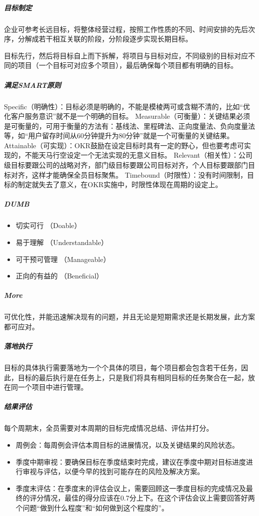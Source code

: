 \documentclass[letterpaper,11pt,english]{sphinxmanual}
\begin{document}
\subparagraph{目标制定}
\label{\detokenize{chapter_idea/goal:id1}}
企业可参考长远目标，将整体经营过程，按照工作性质的不同、时间安排的先后次序，分解成若干相互关联的阶段，分阶段逐步实现长期目标。

目标先行，然后将目标自上而下拆解，将项目与目标对应，不同级别的目标对应不同的项目（一个目标可对应多个项目），最后确保每个项目都有明确的目标。


\subparagraph{满足SMART原则}
\label{\detokenize{chapter_idea/goal:smart}}
Specific（明确性）：目标必须是明确的，不能是模棱两可或含糊不清的，比如“优化客户服务意识”就不是一个明确的目标。
Measurable（可衡量）：关键结果必须是可衡量的，可用于衡量的方法有：基线法、里程碑法、正向度量法、负向度量法等，如“用户留存时间从60分钟提升为80分钟”就是一个可衡量的关键结果。
Attainable（可实现）：OKR鼓励在设定目标时具有一定的野心，但也要考虑可实现的，不能天马行空设定一个无法实现的无意义目标。
Relevant（相关性）：公司级目标要跟公司的战略对齐，部门级目标要跟公司目标对齐，个人目标要跟部门目标对齐，这样才能确保全员目标聚焦。
Time\sphinxhyphen{}bound（时限性）：没有时间限制，目标的制定就失去了意义，在OKR实施中，时限性体现在周期的设定上。


\subparagraph{DUMB}
\label{\detokenize{chapter_idea/goal:dumb}}\begin{itemize}
\item {} 
切实可行 （Doable）

\item {} 
易于理解 （Understandable）

\item {} 
可干预可管理 （Manageable）

\item {} 
正向的有益的 （Beneficial）

\end{itemize}


\subparagraph{More}
\label{\detokenize{chapter_idea/goal:more}}
可优化性，并能迅速解决现有的问题，并且无论是短期需求还是长期发展，此方案都可应对。


\subparagraph{落地执行}
\label{\detokenize{chapter_idea/goal:id2}}
目标的具体执行需要落地为一个个具体的项目，每个项目都会包含若干任务，因此，目标的最后执行是在任务上，只是我们将具有相同目标的任务聚合在一起，放在同一个项目中进行管理。


\subparagraph{结果评估}
\label{\detokenize{chapter_idea/goal:id3}}
每个周期末，全员需要对本周期的目标完成情况总结、评估并打分。
\begin{itemize}
\item {} 
周例会：每周例会评估本周目标的进展情况，以及关键结果的风险状态。

\item {} 
季度中期审视：要确保目标在季度结束时完成，建议在季度中期对目标进度进行审视与评估，以便今早的找到可能存在的风险及解决方案。

\item {} 
季度末评估：在季度末的评估会议上，需要回顾这一季度目标的完成情况及最终的评分情况，最佳的得分应该在0.7分上下。在这个评估会议上需要回答好两个问题“做到什么程度”和“如何做到这个程度的”。

\end{itemize}
\end{document}
